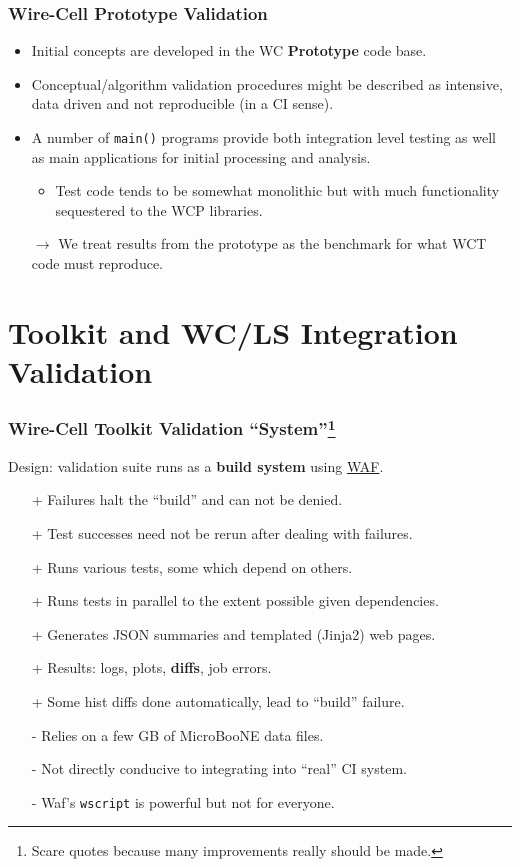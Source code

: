 \documentclass[xcolor=dvipsnames]{beamer}
\begin{document}
\begin{frame}
  \frametitle{Wire-Cell Prototype Validation}
  \begin{itemize}\footnotesize
  \item Initial concepts are developed in the WC \textbf{Prototype} code base.
  \item Conceptual/algorithm validation procedures might be described
    as intensive, data driven and not reproducible (in a CI sense).
  \item A number of \texttt{main()} programs provide both integration
    level testing as well as main applications for initial processing and analysis.
    \begin{itemize}\scriptsize
    \item Test code tends to be somewhat monolithic but with much
      functionality sequestered to the WCP libraries.
    \end{itemize}
  \item [$\to$] We treat results from the prototype as the benchmark
    for what WCT code must reproduce.
  \end{itemize}
\end{frame}

\section{Toolkit and WC/LS Integration Validation}

\begin{frame}
  \frametitle{Wire-Cell Toolkit Validation ``System''\footnote{Scare quotes because many improvements really should be made.}}
  Design: validation suite runs as a \textbf{build system} using \href{https://waf.io/}{WAF}.
    \begin{itemize}\footnotesize
    \item[+] Failures halt the ``build'' and can not be denied.
    \item[+] Test successes need not be rerun after dealing with failures.
    \item[+] Runs various tests, some which depend on others.
    \item[+] Runs tests in parallel to the extent possible given dependencies.
    \item[+] Generates JSON summaries and templated (Jinja2) web pages.
    \item[+] Results: logs, plots, \textbf{diffs}, job errors.
    \item[+] Some hist diffs done automatically, lead to ``build'' failure.
    \item[-] Relies on a few GB of MicroBooNE data files.
    \item[-] Not directly conducive to integrating into ``real'' CI system.
    \item[-] Waf's \texttt{wscript} is powerful but not for everyone.
    \end{itemize}
    
\end{frame}
\end{document}
